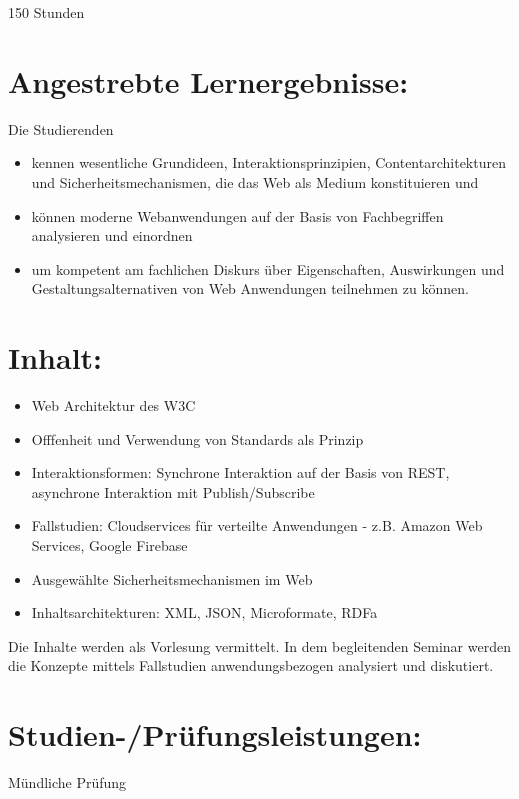 150 Stunden

\section*{Angestrebte
Lernergebnisse:}\label{angestrebte-lernergebnisse-11}

Die Studierenden

\begin{itemize}
\item
  kennen wesentliche Grundideen, Interaktionsprinzipien,
  Contentarchitekturen und Sicherheitsmechanismen, die das Web als
  Medium konstituieren und
\item
  können moderne Webanwendungen auf der Basis von Fachbegriffen
  analysieren und einordnen
\item
  um kompetent am fachlichen Diskurs über Eigenschaften, Auswirkungen
  und Gestaltungsalternativen von Web Anwendungen teilnehmen zu können.
\end{itemize}

\section*{Inhalt:}\label{inhalt-11}

\begin{itemize}
\item
  Web Architektur des W3C
\item
  Offfenheit und Verwendung von Standards als Prinzip
\item
  Interaktionsformen: Synchrone Interaktion auf der Basis von REST,
  asynchrone Interaktion mit Publish/Subscribe
\item
  Fallstudien: Cloudservices für verteilte Anwendungen - z.B. Amazon Web
  Services, Google Firebase
\item
  Ausgewählte Sicherheitsmechanismen im Web
\item
  Inhaltsarchitekturen: XML, JSON, Microformate, RDFa
\end{itemize}

Die Inhalte werden als Vorlesung vermittelt. In dem begleitenden Seminar
werden die Konzepte mittels Fallstudien anwendungsbezogen analysiert und
diskutiert.

\section*{Studien-/Prüfungsleistungen:}\label{studien-pruxfcfungsleistungen-7}

Mündliche Prüfung

